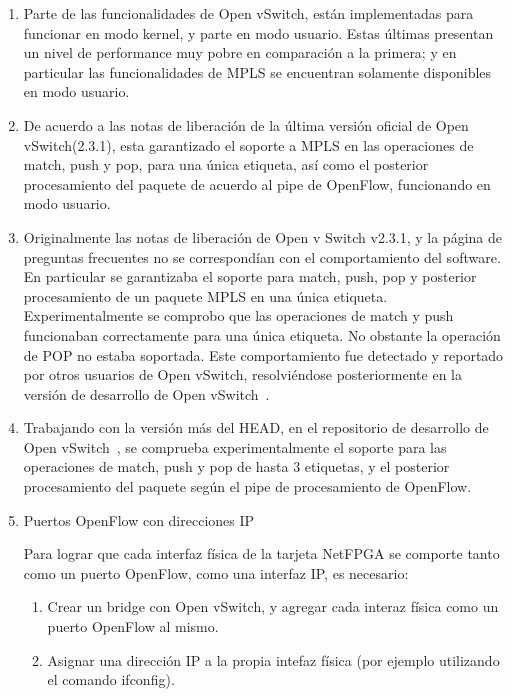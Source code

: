 \begin{enumerate}
\item Parte de las funcionalidades de Open vSwitch, est\'an implementadas para funcionar en modo kernel, y parte en modo usuario. Estas \'ultimas presentan un nivel de performance muy pobre en comparaci\'on a la primera; y en particular las funcionalidades de MPLS se encuentran solamente disponibles en modo usuario.

\item De acuerdo a las notas de liberaci\'on de la \'ultima versi\'on oficial de Open vSwitch(2.3.1), 
esta garantizado el soporte a MPLS en las operaciones de match, push y pop, para una \'unica etiqueta, as\'i como el posterior procesamiento del paquete de acuerdo al pipe de OpenFlow, funcionando en modo usuario.

\item Originalmente las notas de liberaci\'on de Open v Switch v2.3.1, y la p\'agina de preguntas frecuentes no se correspond\'ian con el comportamiento del software. En particular se garantizaba el soporte para match, push, pop y posterior procesamiento de un paquete MPLS en una \'unica etiqueta.
Experimentalmente se comprobo que las operaciones de match y push funcionaban correctamente para una \'unica etiqueta. No obstante la operaci\'on de POP no estaba soportada. Este comportamiento fue detectado y reportado por otros usuarios de Open vSwitch, resolviéndose posteriormente en la versi\'on de desarrollo de Open vSwitch~\citep{OVSSourceCode}.

\item Trabajando con la versi\'on m\'as del HEAD, en el repositorio de desarrollo de Open vSwitch~\citep{OVSSourceCode}, se comprueba experimentalmente el soporte para las operaciones de match, push y pop de hasta 3 etiquetas, y el posterior procesamiento del paquete seg\'un el pipe de procesamiento de OpenFlow.

\item Puertos OpenFlow con direcciones IP
 
Para lograr que cada interfaz f\'isica de la tarjeta NetFPGA se comporte tanto como un puerto OpenFlow, como una interfaz IP, es necesario:

\begin{enumerate}
\item Crear un bridge con Open vSwitch, y agregar cada interaz f\'isica como un puerto OpenFlow al mismo.
\item Asignar una dirección IP a la propia intefaz f\'isica (por ejemplo utilizando el comando ifconfig).
\end{enumerate}


\end{enumerate}
